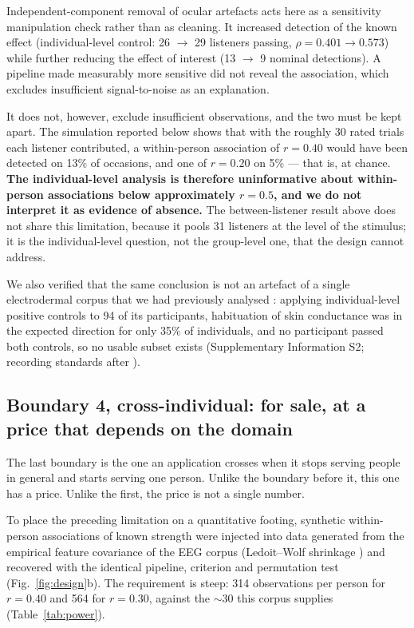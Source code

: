 Independent-component removal of ocular artefacts acts here as a sensitivity
manipulation check rather than as cleaning. It increased detection of the known
effect (individual-level control: 26 $\rightarrow$ 29 listeners passing,
$\rho = 0.401 \rightarrow 0.573$) while further reducing the effect of interest
(13 $\rightarrow$ 9 nominal detections). A pipeline made measurably more sensitive
did not reveal the association, which excludes insufficient signal-to-noise as an
explanation.

It does not, however, exclude insufficient observations, and the two must be kept
apart. The simulation reported below shows that with the roughly 30 rated trials
each listener contributed, a within-person association of $r = 0.40$ would have
been detected on 13\% of occasions, and one of $r = 0.20$ on 5\% --- that is, at
chance. \textbf{The individual-level analysis is therefore uninformative about
within-person associations below approximately $r = 0.5$, and we do not interpret
it as evidence of absence.} The between-listener result above does not share this
limitation, because it pools 31 listeners at the level of the stimulus; it is the
individual-level question, not the group-level one, that the design cannot address.

We also verified that the same conclusion is not an artefact of a single
electrodermal corpus that we had previously analysed \citep{kutt2022}: applying
individual-level positive controls to 94 of its participants, habituation of skin
conductance was in the expected direction for only 35\% of individuals, and no
participant passed both controls, so no usable subset exists (Supplementary
Information S2; recording standards after \citealp{boucsein2012}).

\subsection*{Boundary 4, cross-individual: for sale, at a price that depends on the
domain}

The last boundary is the one an application crosses when it stops serving people in
general and starts serving one person. Unlike the boundary before it, this one has
a price. Unlike the first, the price is not a single number.

To place the preceding limitation on a quantitative footing, synthetic within-person
associations of known strength were injected into data generated from the empirical
feature covariance of the EEG corpus (Ledoit--Wolf shrinkage \citep{ledoit2004})
and recovered with the identical pipeline, criterion and permutation test
(Fig.~\ref{fig:design}b). The requirement is steep: 314 observations per person for
$r = 0.40$ and 564 for $r = 0.30$, against the $\sim$30 this corpus supplies
(Table~\ref{tab:power}).

